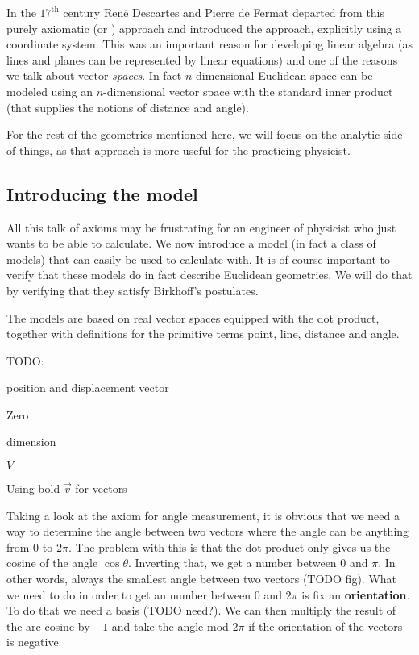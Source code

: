 In the $17^\text{th}$ century René Descartes and Pierre de Fermat departed from this purely axiomatic (or ) approach and introduced the  approach, explicitly using a coordinate system. This was an important reason for developing linear algebra (as lines and planes can be represented by linear equations) and one of the reasons we talk about vector \textit{spaces}. In fact $n$-dimensional Euclidean space can be modeled using an $n$-dimensional vector space with the standard inner product (that supplies the notions of distance and angle).

For the rest of the geometries mentioned here, we will focus on the analytic side of things, as that approach is more useful for the practicing physicist.

\subsection{Introducing the model}
All this talk of axioms may be frustrating for an engineer of physicist who just wants to be able to calculate. We now introduce a model (in fact a class of models) that can easily be used to calculate with. It is of course important to verify that these models do in fact describe Euclidean geometries. We will do that by verifying that they satisfy Birkhoff's postulates.

The models are based on real vector spaces equipped with the dot product, together with definitions for the primitive terms point, line, distance and angle.

TODO:

position and displacement vector

Zero

dimension

$V$

Using bold $\vec{v}$ for vectors

Taking a look at the axiom for angle measurement, it is obvious that we need a way to determine the angle between two vectors where the angle can be anything from $0$ to $2\pi$. The problem with this is that the dot product only gives us the cosine of the angle $\cos{\theta}$. Inverting that, we get a number between $0$ and $\pi$. In other words, always the smallest angle between two vectors (TODO fig). What we need to do in order to get an number between $0$ and $2\pi$ is fix an \textbf{orientation}. To do that we need a basis (TODO need?). We can then multiply the result of the arc cosine by $-1$ and take the angle mod $2\pi$ if the orientation of the vectors is negative.


